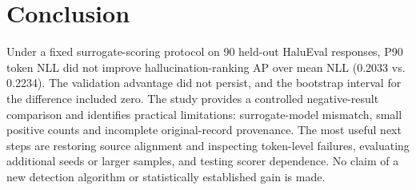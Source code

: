 \documentclass[manuscript,screen]{acmart}
\begin{document}
\section{Conclusion}
Under a fixed surrogate-scoring protocol on 90 held-out HaluEval responses, P90 token NLL did not improve hallucination-ranking AP over mean NLL (0.2033 vs. 0.2234). The validation advantage did not persist, and the bootstrap interval for the difference included zero. The study provides a controlled negative-result comparison and identifies practical limitations: surrogate-model mismatch, small positive counts and incomplete original-record provenance. The most useful next steps are restoring source alignment and inspecting token-level failures, evaluating additional seeds or larger samples, and testing scorer dependence. No claim of a new detection algorithm or statistically established gain is made.



\end{document}
